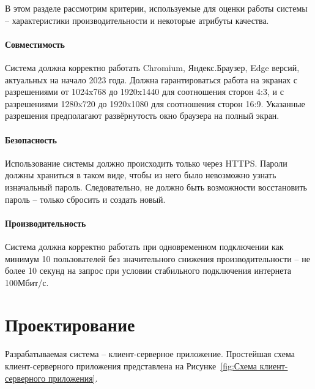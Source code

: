 \documentclass[a4paper,article]{article}
\begin{document}
\begin{sloppypar}
    В этом разделе рассмотрим критерии, используемые для оценки работы системы -- характеристики производительности и некоторые атрибуты качества.

    \paragraph{Совместимость}\label{ТЗ. Интерфейс пользователя}

    Система должна корректно работать Chromium, Яндекс.Браузер, Edge версий, актуальных на начало 2023 года. Должна гарантироваться работа на экранах с разрешениями от 1024x768 до 1920x1440 для соотношения сторон 4:3, и с разрешениями 1280x720 до 1920x1080 для соотношения сторон 16:9. Указанные разрешения предполагают развёрнутость окно браузера на полный экран.

    \paragraph{Безопасность}\label{ТЗ. Безопасность}

    Использование системы должно происходить только через HTTPS. Пароли должны храниться в таком виде, чтобы из него было невозможно узнать изначальный пароль. Следовательно, не должно быть возможности восстановить пароль -- только сбросить и создать новый.

    \paragraph{Производительность}\label{ТЗ. Производительность}

    Система должна корректно работать при одновременном подключении как минимум 10 пользователей без значительного снижения производительности -- не более 10 секунд на запрос при условии стабильного подключения интернета 100Мбит/с.

    \pagestyle{plain}

    \newpage

    \section{Проектирование}\label{Проектирование}

    Разрабатываемая система -- клиент-серверное приложение. Простейшая схема клиент-серверного приложения представлена на Рисунке~\ref{fig:Схема клиент-серверного приложения}.

    \begin{figure}[h]


\end{figure}
\end{sloppypar}
\end{document}

